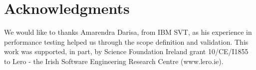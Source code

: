 \documentclass[runningheads,a4paper]{llncs}
\begin{document}
\vspace{-5pt}
\section*{Acknowledgments}
\vspace{-5pt}
We would like to thanks Amarendra Darisa, from IBM SVT, as his experience in
performance testing helped us through the scope definition and validation. This
work was supported, in part, by Science Foundation Ireland grant 10/CE/I1855 to
Lero - the Irish Software Engineering Research Centre (www.lero.ie).

\vspace{-5pt}



\end{document}
